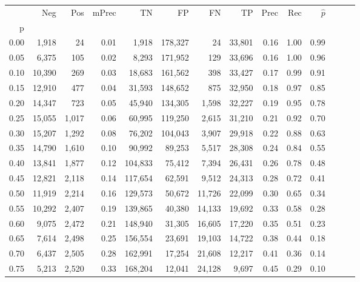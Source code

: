 \begin{tabular}{rrrrrrrrrrrrrr}
\toprule
{} &     Neg &    Pos & mPrec &       TN &       FP &      FN &      TP &  Prec &   Rec & $\hat{p}$ \\
p    &         &        &       &          &          &         &         &       &       &           \\
\midrule
0.00 &   1,918 &     24 &  0.01 &    1,918 &  178,327 &      24 &  33,801 &  0.16 &  1.00 &      0.99 \\
0.05 &   6,375 &    105 &  0.02 &    8,293 &  171,952 &     129 &  33,696 &  0.16 &  1.00 &      0.96 \\
0.10 &  10,390 &    269 &  0.03 &   18,683 &  161,562 &     398 &  33,427 &  0.17 &  0.99 &      0.91 \\
0.15 &  12,910 &    477 &  0.04 &   31,593 &  148,652 &     875 &  32,950 &  0.18 &  0.97 &      0.85 \\
0.20 &  14,347 &    723 &  0.05 &   45,940 &  134,305 &   1,598 &  32,227 &  0.19 &  0.95 &      0.78 \\
0.25 &  15,055 &  1,017 &  0.06 &   60,995 &  119,250 &   2,615 &  31,210 &  0.21 &  0.92 &      0.70 \\
0.30 &  15,207 &  1,292 &  0.08 &   76,202 &  104,043 &   3,907 &  29,918 &  0.22 &  0.88 &      0.63 \\
0.35 &  14,790 &  1,610 &  0.10 &   90,992 &   89,253 &   5,517 &  28,308 &  0.24 &  0.84 &      0.55 \\
0.40 &  13,841 &  1,877 &  0.12 &  104,833 &   75,412 &   7,394 &  26,431 &  0.26 &  0.78 &      0.48 \\
0.45 &  12,821 &  2,118 &  0.14 &  117,654 &   62,591 &   9,512 &  24,313 &  0.28 &  0.72 &      0.41 \\
0.50 &  11,919 &  2,214 &  0.16 &  129,573 &   50,672 &  11,726 &  22,099 &  0.30 &  0.65 &      0.34 \\
0.55 &  10,292 &  2,407 &  0.19 &  139,865 &   40,380 &  14,133 &  19,692 &  0.33 &  0.58 &      0.28 \\
0.60 &   9,075 &  2,472 &  0.21 &  148,940 &   31,305 &  16,605 &  17,220 &  0.35 &  0.51 &      0.23 \\
0.65 &   7,614 &  2,498 &  0.25 &  156,554 &   23,691 &  19,103 &  14,722 &  0.38 &  0.44 &      0.18 \\
0.70 &   6,437 &  2,505 &  0.28 &  162,991 &   17,254 &  21,608 &  12,217 &  0.41 &  0.36 &      0.14 \\
0.75 &   5,213 &  2,520 &  0.33 &  168,204 &   12,041 &  24,128 &   9,697 &  0.45 &  0.29 &      0.10 \\

\end{tabular}
